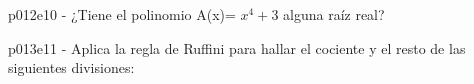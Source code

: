 \documentclass[addpoints,spanish, 12pt,a4paper]{exam}
\begin{document}
\begin{questions}
\begin{multicols}{3}
        \end{multicols}
        \question p012e10 - ¿Tiene el polinomio A(x)= $x^4 +3$ alguna raíz real?
        \begin{multicols}{1} 
        \end{multicols}
        \question p013e11 - Aplica la regla de Ruffini para hallar el cociente y el resto de las siguientes divisiones:
        \begin{multicols}{1} 

\end{multicols}
\end{questions}
\end{document}
